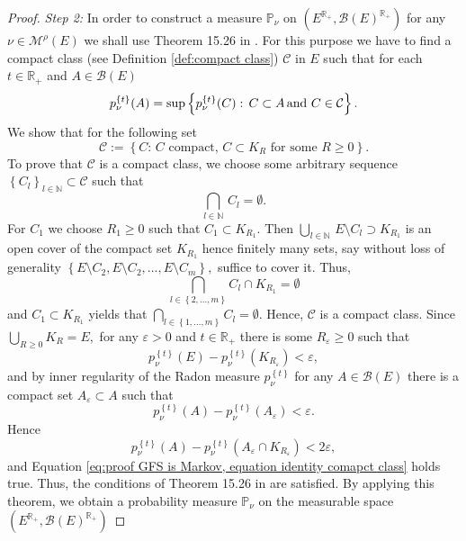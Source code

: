 \documentclass[a4paper,12pt]{article}
\theoremstyle{definition}
\theoremstyle{remark}
\numberwithin{equation}{section}
\numberwithin{theorem}{section}
\begin{document}
\begin{proof}
\emph{Step 2:}  In order to construct a measure $\mathbb{P}_{\nu}$ on $\left(E^{\mathbb{R}_{+}},\mathcal{B}(E)^{\mathbb{R}_{+}}\right)$
for any $\nu\in\mathcal{M}^{\rho}(E)$ 
we shall use Theorem 15.26 in \cite{AlB}. For this purpose 
we have to find a compact class (see Definition \ref{def:compact class})
$\mathcal{C}$ in $E$ such that for each $t\in\mathbb{R}_{+}$ and
$A\in\mathcal{B}(E)$ 
\begin{equation}
p_{\nu}^{\left\{ t\right\} }(A)=\sup\left\{ p_{\nu}^{\left\{ t\right\} }(C):\,C\subset A\text{\,and }C\in\mathcal{C}\right\} .\label{eq:proof GFS is Markov, equation identity comapct class}
\end{equation}
We show that for the following set
\[
\mathcal{C}:=\left\{ C:\,C\text{ compact},\,C\subset K_{R}\text{ for some }R\geq0\right\}. 
\]
To prove that $\mathcal{C}$ is a compact class, we  choose some arbitrary sequence $\left\{ C_{l}\right\} _{l\in\mathbb{N}}\subset\mathcal{C}$
such that
\[
\underset{l\in\mathbb{N}}{\bigcap}\, C_{l}=\emptyset.
\]
For $C_{1}$ we choose $R_{1}\geq0$ such that $C_{1}\subset K_{R_{1}}.$
Then
$
\underset{l\in\mathbb{N}}{\bigcup}\, E\setminus C_{l}\supset K_{R_{1}}
$
is an open cover of the compact set $K_{R_{1}}$ hence finitely many
sets, say without loss of generality $\left\{ E\setminus C_{2},E\setminus C_{2},...,E\setminus C_{m}\right\} ,$
suffice to cover it. Thus, 
\[
\underset{l\in\left\{ 2,...,m\right\} }{\bigcap}C_{l}\cap K_{R_{1}}=\emptyset
\]
and $C_{1}\subset K_{R_{1}}$ yields that
$
\underset{l\in\left\{ 1,...,m\right\} }{\bigcap}C_{l}=\emptyset
$. 
Hence, $\mathcal{C}$ is a compact class.
Since 
$
\underset{R\geq0}{\bigcup}K_{R}=E,
$
 for any $\varepsilon>0$ and $t\in\mathbb{R}_{+}$ there is some
$R_{\varepsilon}\geq0$ such that 
\[
p_{\nu}^{\left\{ t\right\} }\left(E\right)-p_{\nu}^{\left\{ t\right\} }\left(K_{R_{\varepsilon}}\right)<\varepsilon,
\]
and by inner regularity of the Radon measure $p_{\nu}^{\left\{ t\right\} }$
for any $A\in\mathcal{B}(E)$ there is a compact set $A_{\varepsilon}\subset A$
such that 
\[
p_{\nu}^{\left\{ t\right\} }\left(A\right)-p_{\nu}^{\left\{ t\right\} }\left(A_{\varepsilon}\right)<\varepsilon.
\]
Hence 
\[
p_{\nu}^{\left\{ t\right\} }\left(A\right)-p_{\nu}^{\left\{ t\right\} }\left(A_{\varepsilon}\cap K_{R_{\varepsilon}}\right)<2\varepsilon,
\]
and Equation \eqref{eq:proof GFS is Markov, equation identity comapct class}
holds true. Thus, the conditions of Theorem 15.26 in \cite{AlB}
are satisfied. 
By applying this theorem, we obtain a probability measure $\mathbb{P}_{\nu}$
on the measurable space $\left(E^{\mathbb{R}_{+}},\mathcal{B}(E)^{\mathbb{R}_{+}}\right)$

\end{proof}
\end{document}

